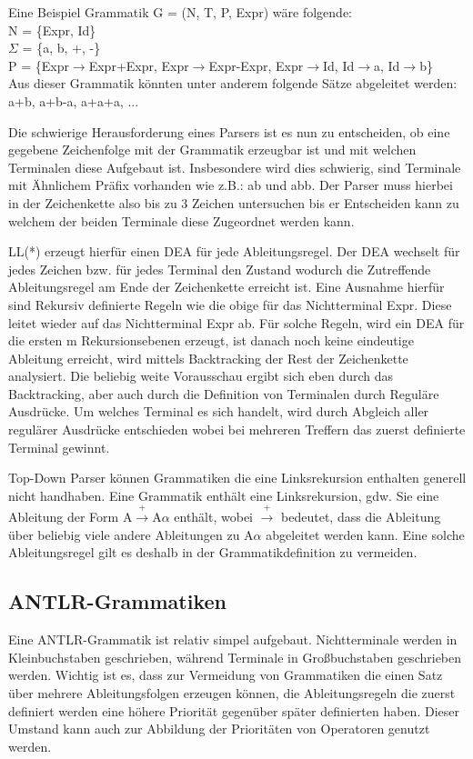 Eine Beispiel Grammatik G = (N, T, P, Expr) wäre folgende: \\
N = \{Expr, Id\} \\
$\Sigma$ = \{a, b, +, -\} \\
P = \{Expr$\rightarrow$Expr+Expr, Expr$\rightarrow$Expr-Expr, Expr$\rightarrow$Id, Id$\rightarrow$a, Id$\rightarrow$b\} \\

Aus dieser Grammatik könnten unter anderem folgende Sätze abgeleitet werden: a+b, a+b-a, a+a+a, ...

Die schwierige Herausforderung eines Parsers ist es nun zu entscheiden, ob eine gegebene Zeichenfolge mit der Grammatik erzeugbar ist und mit welchen Terminalen diese Aufgebaut ist. Insbesondere wird dies schwierig, sind Terminale mit Ähnlichem Präfix vorhanden wie z.B.: ab und abb. Der Parser muss hierbei in der Zeichenkette also bis zu 3 Zeichen untersuchen bis er Entscheiden kann zu welchem der beiden Terminale diese Zugeordnet werden kann.

LL(*) erzeugt hierfür einen \ac{DEA} für jede Ableitungsregel. Der \ac{DEA} wechselt für jedes Zeichen bzw. für jedes Terminal den Zustand wodurch die Zutreffende Ableitungsregel am Ende der Zeichenkette erreicht ist. Eine Ausnahme hierfür sind Rekursiv definierte Regeln wie die obige für das Nichtterminal Expr. Diese leitet wieder auf das Nichtterminal Expr ab. Für solche Regeln, wird ein \ac{DEA} für die ersten m Rekursionsebenen erzeugt, ist danach noch keine eindeutige Ableitung erreicht, wird mittels Backtracking der Rest der Zeichenkette analysiert.
Die beliebig weite Vorausschau ergibt sich eben durch das Backtracking, aber auch durch die Definition von Terminalen durch Reguläre Ausdrücke. Um welches Terminal es sich handelt, wird durch Abgleich aller regulärer Ausdrücke entschieden wobei bei mehreren Treffern das zuerst definierte Terminal gewinnt. \cite{ll_star_parser}

Top-Down Parser können Grammatiken die eine Linksrekursion enthalten generell nicht handhaben. \cite{compiler_dragon_book} Eine Grammatik enthält eine Linksrekursion, gdw. Sie eine Ableitung der Form A$\xrightarrow{\text{+}}$A$\alpha$ enthält, wobei $\xrightarrow{\text{+}}$ bedeutet, dass die Ableitung über beliebig viele andere Ableitungen zu A$\alpha$ abgeleitet werden kann.
Eine solche Ableitungsregel gilt es deshalb in der Grammatikdefinition zu vermeiden.

\subsection{ANTLR-Grammatiken}
Eine ANTLR-Grammatik ist relativ simpel aufgebaut. Nichtterminale werden in Kleinbuchstaben geschrieben, während Terminale in Großbuchstaben geschrieben werden. Wichtig ist es, dass zur Vermeidung von Grammatiken die einen Satz über mehrere Ableitungsfolgen erzeugen können, die Ableitungsregeln die zuerst definiert werden eine höhere Priorität gegenüber später definierten haben. \cite{antlr_doc}
Dieser Umstand kann auch zur Abbildung der Prioritäten von Operatoren genutzt werden.

